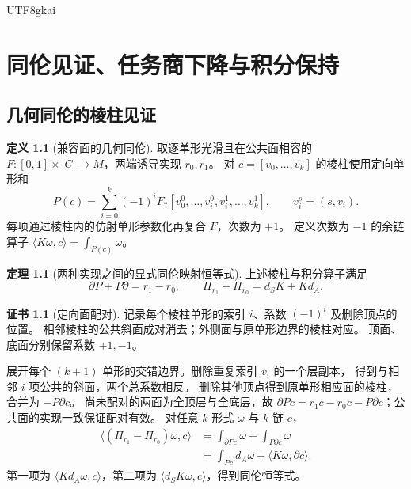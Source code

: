 \documentclass[12pt]{report}
\makeatletter
\theoremstyle{definition}
\newtheorem{definition}{定义}[chapter]
\newtheorem{theorem}{定理}[chapter]
\newtheorem{Certificate}{证书}[chapter]
\renewenvironment{proof}[1][\proofname]{\par
  \pushQED{\qed}\normalfont
  \topsep6\p@\@plus6\p@\relax
  \trivlist
  \item[\hskip\labelsep\normalfont #1\@addpunct{.}]\ignorespaces
}{
  \popQED\endtrivlist\@endpefalse
}
\makeatother
\begin{document}
\begin{CJK*}{UTF8}{gkai}
\chapter{同伦见证、任务商下降与积分保持}
\label{sec:comparison-homotopy}
\section{几何同伦的棱柱见证}
\begin{definition}[兼容面的几何同伦]
\label{def:geometric-homotopy}
取逐单形光滑且在公共面相容的
\(F:[0,1]\times|C|\to M\)，两端诱导实现 \(r_0,r_1\)。
对 \(c=[v_0,\ldots,v_k]\) 的棱柱使用定向单形和
\[
P(c)=\sum_{i=0}^k(-1)^i
F_*[v_0^0,\ldots,v_i^0,v_i^1,\ldots,v_k^1],
\qquad v_i^s=(s,v_i).
\]
每项通过棱柱内的仿射单形参数化再复合 \(F\)，次数为 \(+1\)。
定义次数为 \(-1\) 的余链算子
\(\langle K\omega,c\rangle=\int_{P(c)}\omega\)。
\end{definition}
\begin{theorem}[两种实现之间的显式同伦映射恒等式]
\label{thm:prism-homotopy}
上述棱柱与积分算子满足
\[
\partial P+P\partial=r_1-r_0,\qquad
\Pi_{r_1}-\Pi_{r_0}=d_SK+Kd_A.
\]
\end{theorem}
\begin{Certificate}[定向面配对]
记录每个棱柱单形的索引 \(i\)、系数 \((-1)^i\) 及删除顶点的位置。
相邻棱柱的公共斜面成对消去；外侧面与原单形边界的棱柱对应。
顶面、底面分别保留系数 \(+1,-1\)。
\end{Certificate}
\begin{proof}
展开每个 \((k+1)\) 单形的交错边界。删除重复索引 \(v_i\) 的一个层副本，
得到与相邻 \(i\) 项公共的斜面，两个总系数相反。
删除其他顶点得到原单形相应面的棱柱，合并为 \(-P\partial c\)。
尚未配对的两面为全顶层与全底层，故
\(\partial Pc=r_1c-r_0c-P\partial c\)；公共面的实现一致保证配对有效。
对任意 \(k\) 形式 \(\omega\) 与 \(k\) 链 \(c\)，
\[
\begin{aligned}
\langle(\Pi_{r_1}-\Pi_{r_0})\omega,c\rangle
&=\int_{\partial Pc}\omega+\int_{P\partial c}\omega\\
&=\int_{Pc}d_A\omega+\langle K\omega,\partial c\rangle.
\end{aligned}
\]
第一项为 \(\langle Kd_A\omega,c\rangle\)，第二项为
\(\langle d_SK\omega,c\rangle\)，得到同伦恒等式。
\end{proof}


\end{CJK*}
\end{document}
